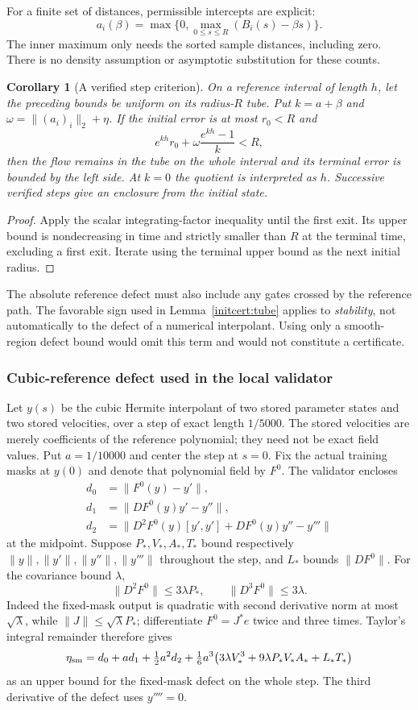 \documentclass[10pt]{article}
\newtheorem{corollary}[theorem]{Corollary}
\begin{document}
For a finite set of distances, permissible intercepts are explicit:
\[
 a_i(\beta)=\max\big\{0,\max_{0\le s\le R}(B_i(s)-\beta s)\big\}.
\]
The inner maximum only needs the sorted sample distances, including zero.
There is no density assumption or asymptotic substitution for these counts.

\begin{corollary}[A verified step criterion]\label{initcert:tube-step}
On a reference interval of length $h$, let the preceding bounds be uniform
on its radius-$R$ tube. Put $k=a+\beta$ and
$\omega=\|(a_i)_i\|_2+\eta$. If the initial error is at most $r_0<R$ and
\[
 e^{kh}r_0+\omega\frac{e^{kh}-1}{k}<R,
\]
then the flow remains in the tube on the whole interval and its terminal
error is bounded by the left side. At $k=0$ the quotient is interpreted as
$h$. Successive verified steps give an enclosure from the initial state.
\end{corollary}
\begin{proof}
Apply the scalar integrating-factor inequality until the first exit. Its
upper bound is nondecreasing in time and strictly smaller than $R$ at the
terminal time, excluding a first exit. Iterate using the terminal upper bound
as the next initial radius.
\end{proof}
The absolute reference defect must also include any gates crossed by the
reference path. The favorable sign used in Lemma~\ref{initcert:tube} applies to
\emph{stability}, not automatically to the defect of a numerical interpolant.
Using only a smooth-region defect bound would omit this term and would not
constitute a certificate.

\subsubsection{Cubic-reference defect used in the local validator}
Let $y(s)$ be the cubic Hermite interpolant of two stored parameter states
and two stored velocities, over a step of exact length $1/5000$.
The stored velocities are merely coefficients of the reference polynomial;
they need not be exact field values. Put $a=1/10000$ and center the step
at $s=0$. Fix the actual training masks at $y(0)$ and denote that polynomial
field by $F^0$. The validator encloses
\begin{align*}
 d_0&=\|F^0(y)-y'\|,\\
 d_1&=\|DF^0(y)y'-y''\|,\\
 d_2&=\|D^2F^0(y)[y',y']+DF^0(y)y''-y'''\|
\end{align*}
at the midpoint. Suppose $P_*,V_*,A_*,T_*$ bound respectively
$\|y\|,\|y'\|,\|y''\|,\|y'''\|$ throughout the step, and $L_*$
bounds $\|DF^0\|$. For the covariance bound $\lambda$,
\[
 \|D^2F^0\|\le3\lambda P_*,\qquad
 \|D^3F^0\|\le3\lambda.
\]
Indeed the fixed-mask output is quadratic with second derivative norm
at most $\sqrt\lambda$, while $\|J\|\le\sqrt\lambda P_*$;
differentiate $F^0=J^*e$ twice and three times.
Taylor's integral remainder therefore gives
\[
 \eta_{\rm sm}=d_0+ad_1+\tfrac12a^2d_2+
 \tfrac16a^3\big(3\lambda V_*^3+9\lambda P_*V_*A_*+L_*T_*\big)
\]
as an upper bound for the fixed-mask defect on the whole step.
The third derivative of the defect uses $y''''=0$.
\end{document}
